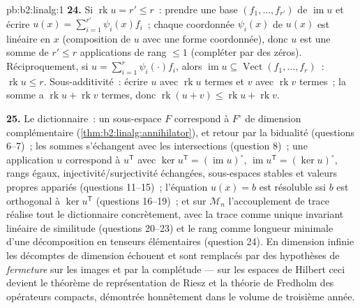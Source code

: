 \begin{solution}{pb:b2:linalg:1}
\textbf{24.} Si $\operatorname{rk} u = r' \leq r$~: prendre une base
$(f_1, \dots, f_{r'})$ de $\operatorname{im} u$ et écrire $u(x)
= \sum_{i=1}^{r'} \psi_i(x) f_i$~; chaque coordonnée $\psi_i(x)$ de
$u(x)$ est linéaire en $x$ (composition de $u$ avec une forme
coordonnée), donc $u$ est une somme de $r' \leq r$ applications de rang
$\leq1$ (compléter par des zéros). Réciproquement, si $u = \sum_{i=1}^r \psi_i(\cdot)f_i$,
alors $\operatorname{im} u \subseteq \operatorname{Vect}(f_1,
\dots, f_r)$~: $\operatorname{rk} u \leq r$. Sous-additivité~: écrire
$u$ avec $\operatorname{rk} u$ termes et $v$ avec
$\operatorname{rk} v$ termes~; la somme a $\operatorname{rk} u +
\operatorname{rk} v$ termes, donc $\operatorname{rk}(u + v) \leq
\operatorname{rk} u + \operatorname{rk} v$.

\textbf{25.} Le dictionnaire~: un sous-espace $F$ correspond à
$F^\circ$ de dimension complémentaire
(\cref{thm:b2:linalg:annihilator}), et retour par la bidualité
(questions 6--7)~; les sommes s'échangent avec les intersections (question 8)~;
une application $u$ correspond à $u^{\mathsf T}$ avec $\ker u^{\mathsf T}
= (\operatorname{im}u)^\circ$, $\operatorname{im}u^{\mathsf T} =
(\ker u)^\circ$, rangs égaux, injectivité/surjectivité
échangées, sous-espaces stables et valeurs propres appariés
(questions 11--15)~; l'équation $u(x) = b$ est
résoluble ssi $b$ est orthogonal à $\ker u^{\mathsf T}$
(questions 16--19)~; et sur $\mathcal{M}_n$ l'accouplement de trace
réalise tout le dictionnaire concrètement, avec la trace comme
unique invariant linéaire de similitude (questions 20--23) et le rang
comme longueur minimale d'une décomposition en tenseurs
élémentaires (question 24). En dimension infinie les décomptes de
dimension échouent et sont remplacés par des hypothèses de
\emph{fermeture} sur les images et par la complétude --- sur les espaces
de Hilbert ceci devient le théorème de représentation de Riesz et la
théorie de Fredholm des opérateurs compacts, démontrée honnêtement dans
le volume de troisième année.
\end{solution}
